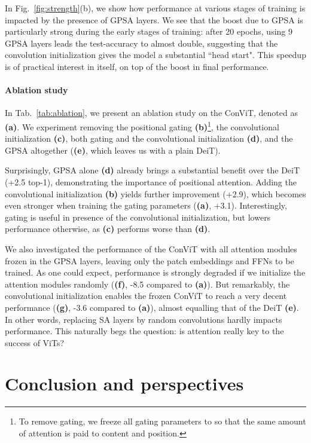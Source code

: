 \documentclass[a4paper,11pt,twocolumn]{article}
\begin{document}
In Fig.~\ref{fig:strength}(b), we show how performance at various stages of training is impacted by the presence of GPSA layers. We see that the boost due to GPSA is particularly strong during the early stages of training: after 20 epochs, using 9 GPSA layers leads the test-accuracy to almost double, suggesting that the convolution initialization gives the model a substantial ``head start". This speedup is of practical interest in itself, on top of the boost in final performance.

\paragraph{Ablation study}
In Tab.~\ref{tab:ablation}, we present an ablation study on the ConViT, denoted as \textbf{(a)}. We experiment removing the positional gating \textbf{(b)}\footnote{To remove gating, we freeze all gating parameters to  so that the same amount of attention is paid to content and position.}, the convolutional initialization \textbf{(c)}, both gating and the convolutional initialization \textbf{(d)}, and the GPSA altogether (\textbf{(e)}, which leaves us with a plain DeiT).

Surprisingly, GPSA alone \textbf{(d)} already brings a substantial benefit over the DeiT (+2.5 top-1), demonstrating the importance of positional attention. Adding the convolutional initialization \textbf{(b)} yields further improvement (+2.9), which becomes even stronger when training the gating parameters (\textbf{(a)}, +3.1). Interestingly, gating is useful in presence of the convolutional initialization, but lowers performance otherwise, as \textbf{(c)} performs worse than \textbf{(d)}.

We also investigated the performance of the ConViT with all attention modules frozen in the GPSA layers, leaving only the patch embeddings and FFNs to be trained. As one could expect, performance is strongly degraded if we initialize the attention modules randomly (\textbf{(f)}, -8.5 compared to \textbf{(a)}). But remarkably, the convolutional initialization enables the frozen ConViT to reach a very decent performance (\textbf{(g)}, -3.6 compared to \textbf{(a)}), almost equalling that of the DeiT \textbf{(e)}. In other words, replacing SA layers by random convolutions hardly impacts performance. This naturally begs the question: is attention really key to the success of ViTs?

\section{Conclusion and perspectives}
\end{document}
